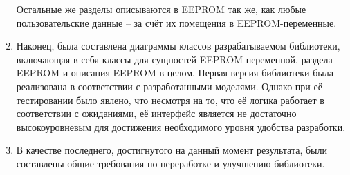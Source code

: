 \documentclass[14pt]{extarticle}
\begin{document}
\begin{enumerate}
	Остальные же разделы описываются в EEPROM так же, как любые пользовательские данные -- за счёт их помещения в EEPROM-переменные.
	\item Наконец, была составлена диаграммы классов разрабатываемом библиотеки, включающая в себя классы для сущностей EEPROM-переменной, раздела EEPROM и описания EEPROM в целом.
	Первая версия библиотеки была реализована в соответствии с разработанными моделями.
	Однако при её тестировании было явлено, что несмотря на то, что её логика работает в соответствии с ожиданиями, её интерфейс является не достаточно высокоуровневым для достижения необходимого уровня удобства разработки.
	\item В качестве последнего, достигнутого на данный момент результата, были составлены общие требования по переработке и улучшению библиотеки.


\end{enumerate}
\end{document}
